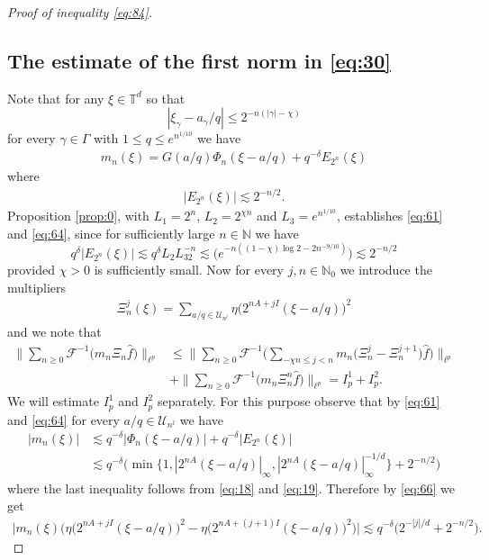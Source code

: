 \documentclass[a4paper,oneside]{amsart}
\theoremstyle{plain}
\theoremstyle{definition}
\numberwithin{equation}{section}
\theoremstyle{plain}
\newcommand{\TT}{\mathbb{T}}
\newcommand{\NN}{\mathbb{N}}
\newcommand{\8}{\infty}
\begin{document}
\begin{proof}[Proof of inequality \eqref{eq:84}]
\subsection{The estimate of the first  norm in \eqref{eq:30}}
 Note that for
any $\xi\in\TT^d$ so that
\[
|\xi_{\gamma}-a_{\gamma}/q|\le 2^{-n(|\gamma|-\chi)}
\] 
for every $\gamma\in \Gamma$
with $1\le q\le e^{n^{1/10}}$ we have 
\begin{align}
\label{eq:61}
  m_n(\xi)=G(a/q)\Phi_n(\xi-a/q)+q^{-\delta}E_{2^n}(\xi)
\end{align}
where 
\begin{align}
\label{eq:64}
  |E_{2^n}(\xi)|\lesssim 2^{-n/2}.
\end{align}
 Proposition \ref{prop:0}, with
$L_1=2^n$, $L_2=2^{\chi n}$ and $L_3=e^{n^{1/10}}$, establishes
\eqref{eq:61} and \eqref{eq:64}, since for sufficiently large
$n\in\NN$ we have
\[
q^{\delta}|E_{2^n}(\xi)|\lesssim q^{\delta}L_2L_32^{-n}\lesssim
\big(e^{-n((1-\chi)\log 2-2n^{-9/10})}\big)\lesssim 2^{-n/2}
\]
provided $\chi>0$ is
sufficiently small. Now for
every $j, n\in\NN_0$ we introduce the
 multipliers
\begin{align}
  \label{eq:69}
  \Xi_{n}^j(\xi)=\sum_{a/q\in\mathscr U_{n^l}}\eta\big(2^{nA+jI}(\xi-a/q)\big)^2
\end{align}
and we note that
\begin{align}
  \label{eq:65}
    \Big\|\sum_{n\ge0}\mathcal
  F^{-1}\big(m_n\Xi_{n}\hat{f}\big)\Big\|_{\ell^p}
&\le \Big\|\sum_{n\ge0}\mathcal
  F^{-1}\Big(\sum_{-\chi n\le j<n}m_n\big(\Xi_{n}^j-\Xi_{n}^{j+1}\big)\hat{f}\Big)\Big\|_{\ell^p}\\
\nonumber&+\Big\|\sum_{n\ge0}\mathcal 
  F^{-1}\big(m_n\Xi_{n}^{n}\hat{f}\big)\Big\|_{\ell^p}=I_p^1+I_p^2.
\end{align}
We will estimate $I_p^1$ and $I_p^2$ separately. For this purpose
observe that by \eqref{eq:61} and \eqref{eq:64} for every
$a/q\in\mathscr U_{n^l}$ we have
\begin{align}
\label{eq:66}  
|m_n(\xi)|&\lesssim 
q^{-\delta}|\Phi_{n}(\xi-a/q)|+q^{-\delta}|E_{2^n}(\xi)|\\
  &\lesssim 
\nonumber q^{-\delta}\big(\min\big\{1, |2^{nA}(\xi-a/q)|_{\infty}, |2^{nA}(\xi-a/q)|_{\infty}^{-1/d}\big\}+2^{-n/2}\big)
\end{align}
where the last inequality follows from \eqref{eq:18} and
\eqref{eq:19}. Therefore by \eqref{eq:66} we get
\begin{align}
\label{eq:71}  
 \big|m_{n}(\xi)
\big(\eta\big(2^{nA+jI}(\xi-a/q)\big)^2-\eta\big(2^{nA+(j+1)I}(\xi-a/q)\big)^2\big)\big|
\lesssim q^{-\delta}\big(2^{-|j|/d}+2^{-n/2}\big).
\end{align}


\end{proof}
\end{document}
